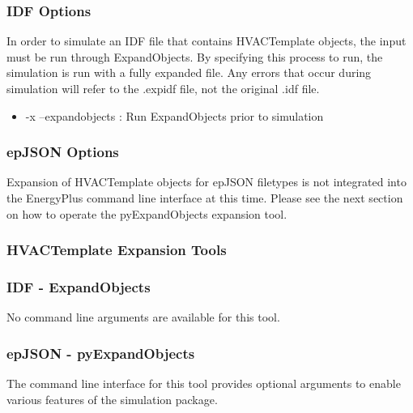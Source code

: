 \subsubsection*{IDF Options}

In order to simulate an IDF file that contains HVACTemplate objects, the input must be run through ExpandObjects.  By specifying this process to run, the simulation is run with a fully expanded file.  Any errors that occur during simulation will refer to the \*.expidf file, not the original \*.idf file.

\begin{itemize}
  
\item
  -x --expandobjects : Run ExpandObjects prior to simulation

\end{itemize}

\subsubsection*{epJSON Options}

Expansion of HVACTemplate objects for epJSON filetypes is not integrated into the EnergyPlus command line interface at this time.  Please see the next section on how to operate the pyExpandObjects expansion tool.

\subsubsection{HVACTemplate Expansion Tools}

\subsubsection*{IDF - ExpandObjects}

No command line arguments are available for this tool.

\subsubsection*{epJSON - pyExpandObjects}

The command line interface for this tool provides optional arguments to enable various features of the simulation package.

